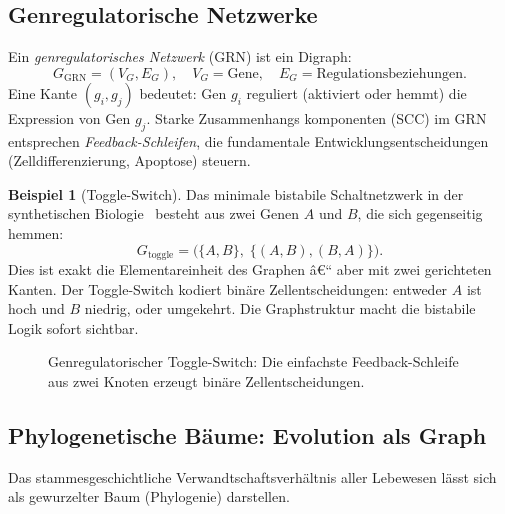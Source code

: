 ﻿\documentclass[12pt,a4paper,twoside]{article}
\theoremstyle{definition}
\newtheorem{beispiel}{Beispiel}[section]
\theoremstyle{plain}
\theoremstyle{remark}
\begin{document}
\subsection{Genregulatorische Netzwerke}

Ein \emph{genregulatorisches Netzwerk} (GRN) ist ein Digraph:
\[
  G_{\text{GRN}} = (V_G, E_G), \quad
  V_G = \text{Gene}, \quad
  E_G = \text{Regulationsbeziehungen}.
\]
Eine Kante $(g_i, g_j)$ bedeutet: Gen $g_i$ reguliert (aktiviert
oder hemmt) die Expression von Gen $g_j$.  Starke Zusammenhangs\-
komponenten (SCC) im GRN entsprechen \emph{Feedback-Schleifen},
die fundamentale Entwicklungsentscheidungen (Zelldifferenzierung,
Apoptose) steuern.

\begin{beispiel}[Toggle-Switch]
Das minimale bistabile Schaltnetzwerk in der synthetischen
Biologie~\cite{Gardner2000} besteht aus zwei Genen $A$ und $B$,
die sich gegenseitig hemmen:
\[
  G_{\text{toggle}} = \bigl(\{A,B\},\; \{(A,B),(B,A)\}\bigr).
\]
Dies ist exakt die Elementareinheit des Graphen â€“ aber mit zwei
gerichteten Kanten.  Der Toggle-Switch kodiert binäre
Zellentscheidungen: entweder $A$ ist hoch und $B$ niedrig,
oder umgekehrt.  Die Graphstruktur macht die bistabile Logik
sofort sichtbar.
\end{beispiel}

\begin{figure}[h]
  \centering
  \caption{Genregulatorischer Toggle-Switch:  Die einfachste
           Feedback-Schleife aus zwei Knoten erzeugt binäre
           Zellentscheidungen.}
  \label{fig:toggle}
\end{figure}

\subsection{Phylogenetische Bäume: Evolution als Graph}

Das stammesgeschichtliche Verwandtschaftsverhältnis aller
Lebewesen lässt sich als gewurzelter Baum (Phylogenie) darstellen.
\end{document}
